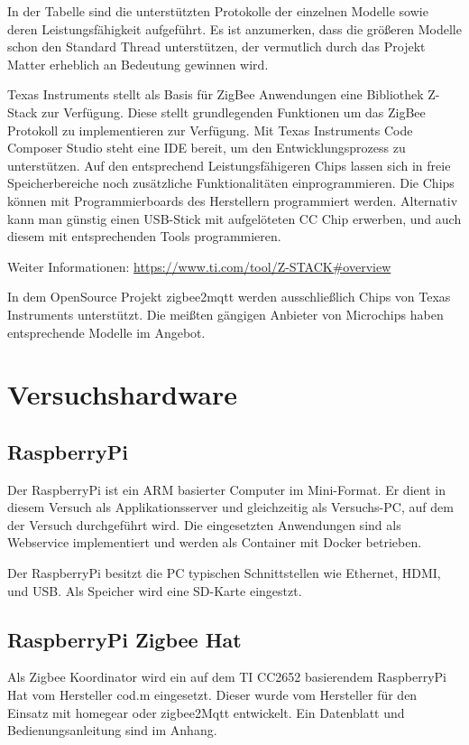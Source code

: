In der Tabelle sind die unterstützten Protokolle der einzelnen Modelle sowie deren Leistungsfähigkeit aufgeführt.
Es ist anzumerken, dass die größeren Modelle schon den Standard Thread unterstützen, der vermutlich durch das
Projekt \grqq Matter\grqq{} erheblich an Bedeutung gewinnen wird.

Texas Instruments stellt als Basis für ZigBee Anwendungen eine Bibliothek \grqq Z-Stack\grqq{} zur Verfügung. Diese stellt grundlegenden 
Funktionen um das ZigBee Protokoll zu implementieren zur Verfügung. Mit Texas Instruments Code Composer Studio steht eine IDE bereit,
um den Entwicklungsprozess zu unterstützen. Auf den entsprechend Leistungsfähigeren Chips lassen sich in freie Speicherbereiche noch zusätzliche
Funktionalitäten einprogrammieren. Die Chips können mit Programmierboards des Herstellern programmiert werden. Alternativ kann man
günstig einen USB-Stick mit aufgelöteten CC Chip erwerben, und auch diesem mit entsprechenden Tools programmieren.

Weiter Informationen: \url{https://www.ti.com/tool/Z-STACK#overview}

In dem OpenSource Projekt zigbee2mqtt werden ausschließlich Chips von Texas Instruments unterstützt. Die meißten gängigen Anbieter von Microchips 
haben entsprechende Modelle im Angebot. 

\section{Versuchshardware}

\subsection{RaspberryPi}

Der RaspberryPi ist ein ARM basierter Computer im Mini-Format. Er dient in diesem Versuch als Applikationsserver und gleichzeitig als Versuchs-PC, 
auf dem der Versuch durchgeführt wird. Die eingesetzten Anwendungen sind 
als Webservice implementiert und werden als Container mit Docker betrieben.

Der RaspberryPi besitzt die PC typischen Schnittstellen wie Ethernet, HDMI, und USB. Als Speicher wird eine SD-Karte eingestzt. 

\subsection{RaspberryPi Zigbee Hat}

Als Zigbee Koordinator wird ein auf dem TI CC2652 basierendem RaspberryPi Hat vom Hersteller cod.m eingesetzt. Dieser wurde vom Hersteller
für den Einsatz mit \grqq homegear\grqq{} oder \grqq zigbee2Mqtt\grqq{} entwickelt. Ein Datenblatt und Bedienungsanleitung sind im Anhang.

